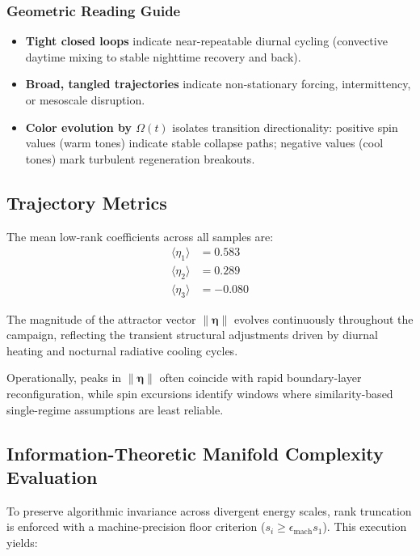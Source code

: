 \documentclass[11pt,a4paper]{article}
\begin{document}
\subsubsection{Geometric Reading Guide}
\begin{itemize}
    \item \textbf{Tight closed loops} indicate near-repeatable diurnal cycling (convective daytime mixing to stable nighttime recovery and back).
    \item \textbf{Broad, tangled trajectories} indicate non-stationary forcing, intermittency, or mesoscale disruption.
    \item \textbf{Color evolution by $\Omega(t)$} isolates transition directionality: positive spin values (warm tones) indicate stable collapse paths; negative values (cool tones) mark turbulent regeneration breakouts.
\end{itemize}

\subsection{Trajectory Metrics}

The mean low-rank coefficients across all samples are:
\begin{align}
    \langle \eta_1 \rangle &= 0.583 \\
    \langle \eta_2 \rangle &= 0.289 \\
    \langle \eta_3 \rangle &= -0.080
\end{align}

The magnitude of the attractor vector $\|\boldsymbol{\eta}\|$ evolves continuously throughout the campaign, reflecting the transient structural adjustments driven by diurnal heating and nocturnal radiative cooling cycles.

Operationally, peaks in $\|\boldsymbol{\eta}\|$ often coincide with rapid boundary-layer reconfiguration, while spin excursions identify windows where similarity-based single-regime assumptions are least reliable.

\subsection{Information-Theoretic Manifold Complexity Evaluation}

To preserve algorithmic invariance across divergent energy scales, rank truncation is enforced with a machine-precision floor criterion ($s_i \ge \epsilon_{\text{mach}} s_1$). This execution yields:
\end{document}
